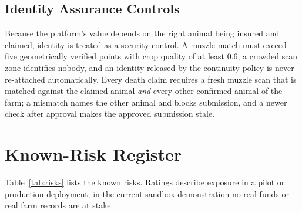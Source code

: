 \documentclass[11pt,letterpaper]{article}
\begin{document}
\subsection{Identity Assurance Controls}

Because the platform's value depends on the right animal being insured and claimed, identity is treated as a security control. A muzzle match must exceed five geometrically verified points with crop quality of at least 0.6, a crowded scan zone identifies nobody, and an identity released by the continuity policy is never re-attached automatically. Every death claim requires a fresh muzzle scan that is matched against the claimed animal \emph{and} every other confirmed animal of the farm; a mismatch names the other animal and blocks submission, and a newer check after approval makes the approved submission stale.

\section{Known-Risk Register}

Table~\ref{tab:risks} lists the known risks. Ratings describe exposure in a pilot or production deployment; in the current sandbox demonstration no real funds or real farm records are at stake.
\end{document}
